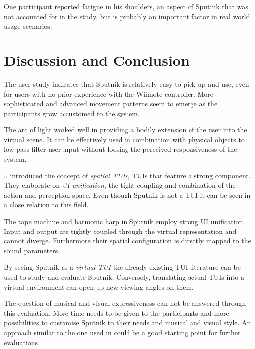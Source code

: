 \documentclass[10pt,a4paper]{scrartcl}
\begin{document}
One participant reported fatigue in his shoulders, an aspect of Sputnik that was not accounted for in the study, but is probably an important factor in real world usage scenarios.






\section{Discussion and Conclusion}
\label{sec:discussion}

The user study indicates that Sputnik is relatively easy to pick up and use, even for users with no prior experience with the Wiimote controller. More sophisticated and advanced movement patterns seem to emerge as the participants grow accustomed to the system.

The arc of light worked well in providing a bodily extension of the user into the virtual scene. It can be effectively used in combination with physical objects to low pass filter user input without loosing the perceived responsiveness of the system.


.. introduced the concept of \emph{spatial TUIs}, TUIs that feature a strong component. They elaborate on \emph{UI unification}, the tight coupling and combination of the action and perception space. Even though Sputnik is not a TUI it can be seen in a close relation to this field.

The tape machine and harmonic harp in Sputnik employ strong UI unification. Input and output are tightly coupled through the virtual representation and cannot diverge. Furthermore their spatial configuration is directly mapped to the sound parameters.

By seeing Sputnik as a \emph{virtual TUI} the already existing TUI literature can be used to study and evaluate Sputnik. Conversely, translating actual TUIs into a virtual environment can open up new viewing angles on them.

	
The question of musical and visual expressiveness can not be answered through this evaluation. More time needs to be given to the participants and more possibilities to customise Sputnik to their needs and musical and visual style. An approach similar to the one used in \cite{Gurevich2010} could be a good starting point for further evaluations.
\end{document}
